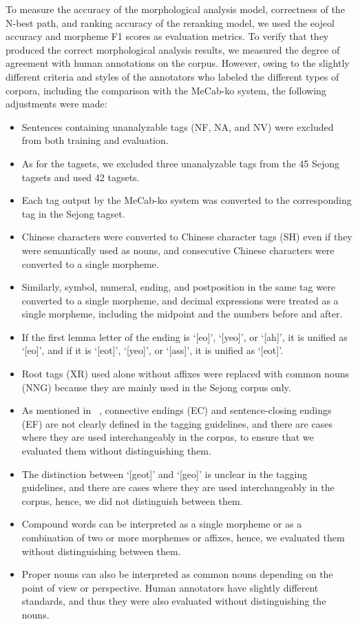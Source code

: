 \documentclass[AMS,STIX2COL]{WileyNJD-v2}
\begin{document}
    To measure the accuracy of the morphological analysis model, correctness of the N-best path, and ranking accuracy of the reranking model, we used the eojeol accuracy and morpheme F1 scores as evaluation metrics. To verify that they produced the correct morphological analysis results, we measured the degree of agreement with human annotations on the corpus. However, owing to the slightly different criteria and styles of the annotators who labeled the different types of corpora, including the comparison with the MeCab-ko system, the following adjustments were made:
    \begin{itemize}
        \item Sentences containing unanalyzable tags (NF, NA, and NV) were excluded from both training and evaluation.
        \item As for the tagsets, we excluded three unanalyzable tags from the 45 Sejong tagsets and used 42 tagsets.
        \item Each tag output by the MeCab-ko system was converted to the corresponding tag in the Sejong tagset.
        \item Chinese characters were converted to Chinese character tags (SH) even if they were semantically used as nouns, and consecutive Chinese characters were converted to a single morpheme.
        \item Similarly, symbol, numeral, ending, and postposition in the same tag were converted to a single morpheme, and decimal expressions were treated as a single morpheme, including the midpoint and the numbers before and after.
        \item If the first lemma letter of the ending is `[eo]', `[yeo]', or `[ah]', it is unified as `[eo]', and if it is `[eot]', `[yeo]', or `[ass]', it is unified as `[eot]'. %
        \item Root tags (XR) used alone without affixes were replaced with common nouns (NNG) because they are mainly used in the Sejong corpus only.
        \item As mentioned in ~\cite{KimIH2010}, connective endings (EC) and sentence-closing endings (EF) are not clearly defined in the tagging guidelines, and there are cases where they are used interchangeably in the corpus, to ensure that we evaluated them without distinguishing them.
        \item The distinction between `[geot]' and `[geo]' is unclear in the tagging guidelines, and there are cases where they are used interchangeably in the corpus, hence, we did not distinguish between them. %
        \item Compound words can be interpreted as a single morpheme or as a combination of two or more morphemes or affixes, hence, we evaluated them without distinguishing between them.
        \item Proper nouns can also be interpreted as common nouns depending on the point of view or perspective. Human annotators have slightly different standards, and thus they were also evaluated without distinguishing the nouns.
    \end{itemize}
\end{document}
